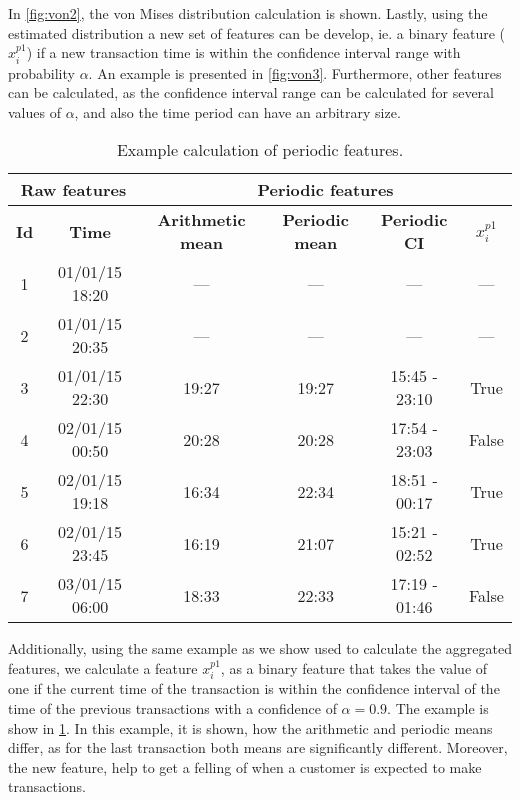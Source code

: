 	In \figurename{ \ref{fig:von2}}, the von Mises distribution calculation is shown.
	Lastly, using the estimated distribution a new set of features can be develop, ie. a binary 	
	feature ($x_i^{p1}$) if a new transaction time is within the confidence interval range with 
	probability 	$\alpha$.	An example is presented in \figurename{ \ref{fig:von3}}. 
	Furthermore, other features can be calculated, as the confidence interval range can be calculated 
	for several values of $\alpha$, and also the time period can have an arbitrary size.

	\begin{table}[!t]
   \caption{Example calculation of periodic features.}
   \label{tab:agg_features_example2}
   \centering
   \begin{tabular}{|c c | c c c c|}
   \hline
   \multicolumn{2}{|c|}{\textbf{Raw features}} & \multicolumn{4}{c|}{\textbf{Periodic features}} 
		\\  \hline
   \textbf{Id} & \textbf{Time} & \textbf{Arithmetic mean} & \textbf{Periodic mean} & 
		\textbf{Periodic CI} & $x_i^{p1}$ \\
   \hline
		1& 01/01/15 18:20& --- & ---	 &	--- & ---\\
		2& 01/01/15 20:35& --- & ---	 &---	 & ---\\
		3& 01/01/15 22:30& 19:27 & 19:27 & 15:45 - 23:10 & True \\
		4& 02/01/15 00:50& 20:28 & 20:28 & 17:54 - 23:03 & False\\
		5& 02/01/15 19:18& 16:34 & 22:34 & 18:51 - 00:17 & True\\
		6& 02/01/15 23:45& 16:19 & 21:07 & 15:21 - 02:52 & True\\
		7& 03/01/15 06:00& 18:33 & 22:33 & 17:19 - 01:46 & False\\
   \hline
   \end{tabular}
   \end{table}

	Additionally, using the same example as we show used to calculate the aggregated features, 
	we calculate a feature $x_i^{p1}$, as a binary feature that takes the value of one if the current 
	time of the transaction is within the confidence interval of the time of the previous 
	transactions with a confidence of $\alpha=0.9$. The example is show in \tablename{ 
	\ref{tab:agg_features_example2}}. In this example, it is shown, how the arithmetic and periodic 
	means differ, as for the last transaction both means are significantly different. Moreover, the 
	new feature, help to get a felling of when a customer is expected to make transactions.
	

